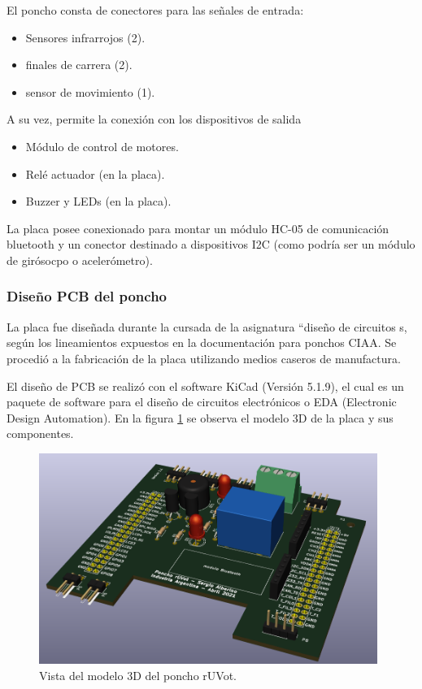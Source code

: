 El poncho consta de conectores para las señales de entrada:

\begin{itemize}
	\item Sensores infrarrojos (2).
	\item finales de carrera (2).
	\item sensor de movimiento (1).
\end{itemize}

A su vez, permite la conexión con los dispositivos de salida

\begin{itemize}
	\item Módulo de control de motores.
	\item Relé actuador (en la placa).
	\item Buzzer y LEDs (en la placa).
\end{itemize}

La placa posee conexionado para montar un módulo HC-05 de comunicación bluetooth y un conector destinado a dispositivos I2C (como podría ser un módulo de girósocpo o acelerómetro).

		\subsubsection{Diseño PCB del poncho}


La placa fue diseñada durante la cursada de la asignatura “diseño de circuitos s, según los lineamientos expuestos en la documentación para ponchos CIAA. Se procedió a la fabricación de la placa utilizando medios caseros de manufactura.

El diseño de PCB se realizó con el software KiCad \citep{KiCad} (Versión 5.1.9), el cual es un paquete de software para el diseño de circuitos electrónicos o EDA (Electronic Design
Automation). En la figura \ref{fig:poncho3d} se observa el modelo 3D de la placa y sus componentes.


\begin{figure}[h]
	\centering
	\includegraphics[width=11cm]{./Figures/ponchoiso.PNG}
	\caption{Vista del modelo 3D del poncho rUVot.}
	\label{fig:poncho3d}
\end{figure}


